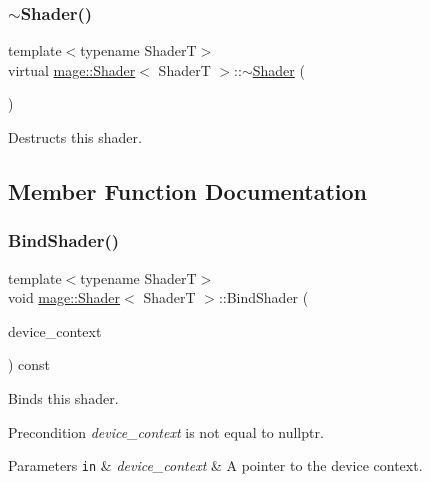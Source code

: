 \subsubsection{\texorpdfstring{$\sim$\+Shader()}{~Shader()}}
{\footnotesize\ttfamily template$<$typename ShaderT$>$ \\
virtual \hyperlink{classmage_1_1_shader}{mage\+::\+Shader}$<$ ShaderT $>$\+::$\sim$\hyperlink{classmage_1_1_shader}{Shader} (\begin{DoxyParamCaption}{ }\end{DoxyParamCaption})\hspace{0.3cm}{\ttfamily [virtual]}}

Destructs this shader. 

\subsection{Member Function Documentation}
\hypertarget{classmage_1_1_shader_a357e84054e9df80c2ff88fc09f3199b3}{}\label{classmage_1_1_shader_a357e84054e9df80c2ff88fc09f3199b3} 
\subsubsection{\texorpdfstring{Bind\+Shader()}{BindShader()}}
{\footnotesize\ttfamily template$<$typename ShaderT$>$ \\
void \hyperlink{classmage_1_1_shader}{mage\+::\+Shader}$<$ ShaderT $>$\+::Bind\+Shader (\begin{DoxyParamCaption}\item[{I\+D3\+D11\+Device\+Context2 $\ast$}]{device\+\_\+context }\end{DoxyParamCaption}) const\hspace{0.3cm}{\ttfamily [noexcept]}}

Binds this shader.

\begin{DoxyPrecond}{Precondition}
{\itshape device\+\_\+context} is not equal to {\ttfamily nullptr}. 
\end{DoxyPrecond}

\begin{DoxyParams}[1]{Parameters}
\mbox{\tt in}  & {\em device\+\_\+context} & A pointer to the device context. \\
\hline
\end{DoxyParams}
\hypertarget{classmage_1_1_shader_ac4a8d4eebb3db5022b5262d516ca68c4}{}\label{classmage_1_1_shader_ac4a8d4eebb3db5022b5262d516ca68c4} 
